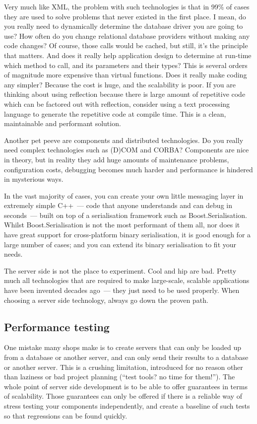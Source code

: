 \documentclass{memoir}
\begin{document}
Very much like XML, the problem with such technologies is that in 99\%
of cases they are used to solve problems that never existed in the
first place. I mean, do you really need to dynamically determine the
database driver you are going to use? How often do you change
relational database providers without making any code changes? Of
course, those calls would be cached, but still, it's the principle
that matters. And does it really help application design to determine
at run-time which method to call, and its parameters and their types?
This is several orders of magnitude more expensive than virtual
functions. Does it really make coding any simpler? Because the cost is
huge, and the scalability is poor. If you are thinking about using
reflection because there is large amount of repetitive code which can
be factored out with reflection, consider using a text processing
language to generate the repetitive code at compile time. This is a
clean, maintainable and performant solution.

Another pet peeve are components and distributed technologies. Do you
really need complex technologies such as (D)COM and CORBA? Components
are nice in theory, but in reality they add huge amounts of
maintenance problems, configuration costs, debugging becomes much
harder and performance is hindered in mysterious ways.

In the vast majority of cases, you can create your own little
messaging layer in extremely simple C++~--- code that anyone
understands and can debug in seconds~--- built on top of a
serialisation framework such as Boost.Serialisation. Whilst
Boost.Serialisation is not the most performant of them all, nor does
it have great support for cross-platform binary serialisation, it is
good enough for a large number of cases; and you can extend its binary
serialisation to fit your needs.

The server side is not the place to experiment. Cool and hip are
bad. Pretty much all technologies that are required to make
large-scale, scalable applications have been invented decades ago~---
they just need to be used properly. When choosing a server side
technology, always go down the proven path.

\subsection{Performance testing}

One mistake many shops make is to create servers that can only be
loaded up from a database or another server, and can only send their
results to a database or another server. This is a crushing
limitation, introduced for no reason other than laziness or bad
project planning (``test tools? no time for them!''). The whole point
of server side development is to be able to offer guarantees in terms
of scalability. Those guarantees can only be offered if there is a
reliable way of stress testing your components independently, and
create a baseline of such tests so that regressions can be found
quickly.
\end{document}
